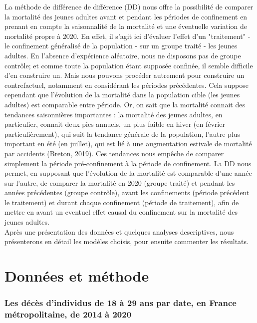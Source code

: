 \documentclass[titlepage]{article}
\begin{document}
La méthode de différence de différence (DD) nous offre la possibilité de comparer la mortalité des jeunes adultes avant et pendant les périodes de confinement en prenant en compte la saisonnalité de la mortalité et une éventuelle variation de mortalité propre à 2020. En effet, il s'agit ici d'évaluer l'effet d'un "traitement" - le confinement généralisé de la population - sur un groupe traité - les jeunes adultes. En l'absence d'expérience aléatoire, nous ne disposons pas de groupe contrôle; et comme toute la population étant supposée confinée, il semble difficile d'en construire un. Mais nous pouvons procéder autrement pour construire un contrefactuel, notamment en considérant les périodes précédentes. Cela suppose cependant que l’évolution de la mortalité dans la population cible (les jeunes adultes) est comparable entre période. Or, on sait que la mortalité connait des tendances saisonnières importantes : la mortalité des jeunes adultes, en particulier, connait deux pics annuels, un plus faible en hiver (en février particulièrement), qui suit la tendance générale de la population, l'autre plus important en été (en juillet), qui est lié à une augmentation estivale de mortalité par accidents (Breton, 2019). Ces tendances nous empêche de comparer simplement la période pré-confinement à la période de confinement. La DD nous permet, en supposant que l'évolution de la mortalité est comparable d'une année sur l'autre, de comparer la mortalité en 2020 (groupe traité) et pendant les années précédentes (groupe contrôle), avant les confinements (période précédent le traitement) et durant chaque confinement (période de traitement), afin de mettre en avant un eventuel effet causal du confinement sur la mortalité des jeunes adultes. \\

Après une présentation des données et quelques analyses descriptives, nous présenterons en détail les modèles choisis, pour ensuite commenter les résultats.


\section*{Données et méthode}



\subsubsection*{Les décès d'individus de 18 à 29 ans par date, en France métropolitaine, de 2014 à 2020}
\end{document}
